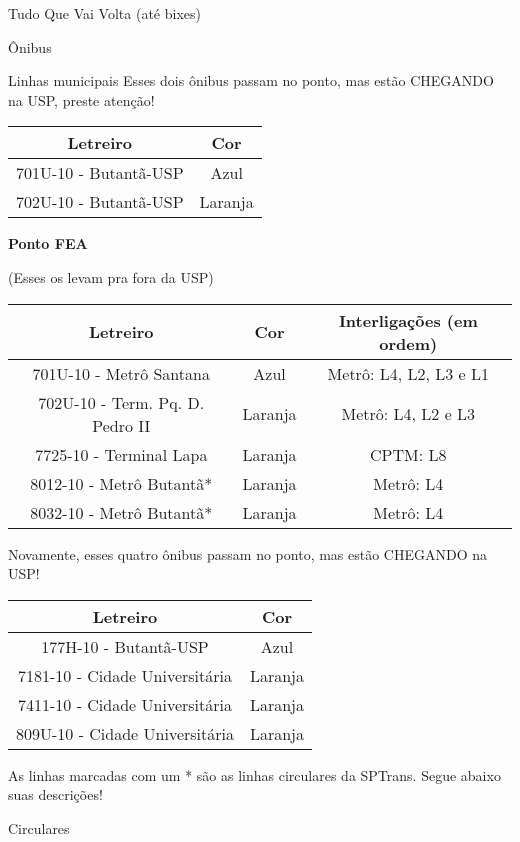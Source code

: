 \begin{secao}{Tudo Que Vai Volta (até bixes)}
\begin{subsecao}{Ônibus}
\begin{subsubsecao}{Linhas municipais}
Esses dois ônibus passam no ponto, mas estão CHEGANDO na USP, preste 
atenção!

\begin{center}
	\begin{tabular}{|c|c|}
	  \hline
	  Letreiro & Cor\\
	  \hline
	  701U-10 - Butantã-USP & Azul\\
	  702U-10 - Butantã-USP & Laranja\\
	  \hline
	\end{tabular}
\end{center}

{\bf Ponto FEA}

(Esses os levam pra fora da USP)
\begin{center}
	\begin{tabular}{|c|c|c|}
      \hline
	  Letreiro & Cor & Interligações (em ordem)\\
	  \hline
	  701U-10 - Metrô Santana & Azul & Metrô: L4, L2, L3 e L1\\
	  702U-10 - Term. Pq. D. Pedro II & Laranja & Metrô: L4, L2 e L3\\
	  7725-10 - Terminal Lapa & Laranja & CPTM: L8\\
	  8012-10 - Metrô Butantã* & Laranja & Metrô: L4\\
	  8032-10 - Metrô Butantã* & Laranja & Metrô: L4\\
      \hline
	\end{tabular}
\end{center}

Novamente, esses quatro ônibus passam no ponto, mas estão CHEGANDO na USP!
\begin{center}
	\begin{tabular}{|c|c|}
	  \hline
	  Letreiro & Cor\\
	  \hline
	  177H-10 - Butantã-USP & Azul\\
	  7181-10 - Cidade Universitária & Laranja\\
	  7411-10 - Cidade Universitária & Laranja\\
	  809U-10 - Cidade Universitária & Laranja\\
	  \hline
	\end{tabular}
\end{center}

As linhas marcadas com um * são as linhas circulares da SPTrans. Segue abaixo suas descrições!

\end{subsubsecao}

\begin{subsubsecao}{Circulares}


\end{subsubsecao}
\end{subsecao}
\end{secao}
